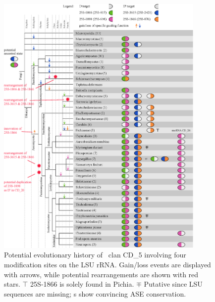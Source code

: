 \begin{figure}
  \centering
  \includegraphics[width=0.9\textwidth]{pics/target_switches_CD_5.eps}
  \caption[Potential evolutionary history of \sno\ clan
  CD\_5.]{Potential evolutionary history of \sno\ clan CD\_5 involving
    four modification sites on the LSU rRNA. Gain/loss events are
    displayed with arrows, while potential rearrangements are shown
    with red stars. $\top$ 25S-1866 is solely found in Pichia. $\mp$
    Putative since LSU sequences are missing; \sno s show convincing
    ASE conservation.}
  \label{fig:CD_5}
\end{figure}

